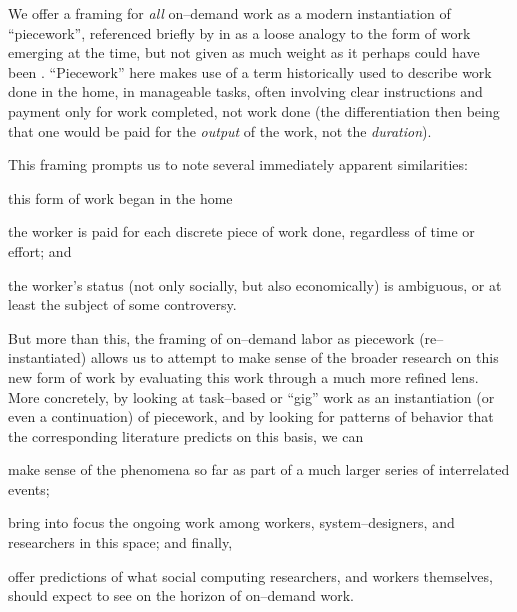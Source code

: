 \documentclass[trackingWork]{subfiles}
\begin{document}
We offer a framing for \textit{all} on--demand work as a modern instantiation of ``piecework'',
referenced briefly by
\citeauthor{crowdworkFuture}
in
\citeyear{crowdworkFuture}
as a loose analogy to the form of work emerging at the time,
but not given as much weight as it perhaps could have been
\cite{crowdworkFuture}.
``Piecework'' here makes use of
a term historically used to describe work done in the home,
in manageable tasks,
often involving clear instructions
and payment only for work completed, not work done
(the differentiation then being that
one would be paid for the \textit{output} of the work,
not the \textit{duration}).

This framing prompts us to note several immediately apparent similarities:
\begin{inlinelist}
\item this form of work began in the home
\item the worker is paid for each discrete piece of work done, regardless of time or effort; and
\item the worker's status
(not only socially, but also economically)
is ambiguous, or at least the subject of some controversy.
\end{inlinelist}



But more than this,
the framing of on--demand labor as piecework (re--instantiated)
allows us to attempt to make sense of the broader research on this new form of work
by evaluating this work through a much more refined lens.
More concretely, by looking at task--based or ``gig'' work as
an instantiation (or even a continuation) of piecework,
and by looking for patterns of behavior that the corresponding literature predicts
on this basis, we can
\begin{inlinelist}
  \item make sense of the phenomena so far as part of a much larger series of interrelated events;
  \item bring into focus the ongoing work among workers, system--designers, and researchers in this space; and finally,
  \item offer predictions of what social computing researchers,
        and workers themselves,
        should expect to see on the horizon of on--demand work.
\end{inlinelist}
\end{document}
